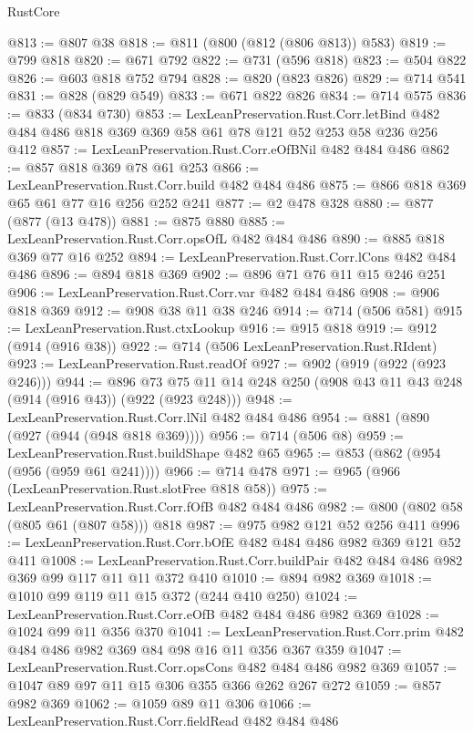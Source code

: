 \begin{lexlean}{RustCore}
\begin{coremodule}
@813 := @807 @38
@818 := @811 (@800 (@812 (@806 @813)) @583)
@819 := @799 @818
@820 := @671 @792
@822 := @731 (@596 @818)
@823 := @504 @822
@826 := @603 @818 @752 @794
@828 := @820 (@823 @826)
@829 := @714 @541
@831 := @828 (@829 @549)
@833 := @671 @822 @826
@834 := @714 @575
@836 := @833 (@834 @730)
@853 := LexLeanPreservation.Rust.Corr.letBind
    @482
    @484
    @486
    @818
    @369
    @369
    @58
    @61
    @78
    @121
    @52
    @253
    @58
    @236
    @256
    @412
@857 := LexLeanPreservation.Rust.Corr.eOfBNil @482 @484 @486
@862 := @857 @818 @369 @78 @61 @253
@866 := LexLeanPreservation.Rust.Corr.build @482 @484 @486
@875 := @866 @818 @369 @65 @61 @77 @16 @256 @252 @241
@877 := @2 @478 @328
@880 := @877 (@877 (@13 @478))
@881 := @875 @880
@885 := LexLeanPreservation.Rust.Corr.opsOfL @482 @484 @486
@890 := @885 @818 @369 @77 @16 @252
@894 := LexLeanPreservation.Rust.Corr.lCons @482 @484 @486
@896 := @894 @818 @369
@902 := @896 @71 @76 @11 @15 @246 @251
@906 := LexLeanPreservation.Rust.Corr.var @482 @484 @486
@908 := @906 @818 @369
@912 := @908 @38 @11 @38 @246
@914 := @714 (@506 @581)
@915 := LexLeanPreservation.Rust.ctxLookup
@916 := @915 @818
@919 := @912 (@914 (@916 @38))
@922 := @714 (@506 LexLeanPreservation.Rust.RIdent)
@923 := LexLeanPreservation.Rust.readOf
@927 := @902 (@919 (@922 (@923 @246)))
@944 := @896 @73 @75 @11 @14 @248 @250 (@908 @43 @11 @43 @248 (@914 (@916 @43)) (@922 (@923 @248)))
@948 := LexLeanPreservation.Rust.Corr.lNil @482 @484 @486
@954 := @881 (@890 (@927 (@944 (@948 @818 @369))))
@956 := @714 (@506 @8)
@959 := LexLeanPreservation.Rust.buildShape @482 @65
@965 := @853 (@862 (@954 (@956 (@959 @61 @241))))
@966 := @714 @478
@971 := @965 (@966 (LexLeanPreservation.Rust.slotFree @818 @58))
@975 := LexLeanPreservation.Rust.Corr.fOfB @482 @484 @486
@982 := @800 (@802 @58 (@805 @61 (@807 @58))) @818
@987 := @975 @982 @121 @52 @256 @411
@996 := LexLeanPreservation.Rust.Corr.bOfE @482 @484 @486 @982 @369 @121 @52 @411
@1008 := LexLeanPreservation.Rust.Corr.buildPair @482 @484 @486 @982 @369 @99 @117 @11 @11 @372 @410
@1010 := @894 @982 @369
@1018 := @1010 @99 @119 @11 @15 @372 (@244 @410 @250)
@1024 := LexLeanPreservation.Rust.Corr.eOfB @482 @484 @486 @982 @369
@1028 := @1024 @99 @11 @356 @370
@1041 := LexLeanPreservation.Rust.Corr.prim @482 @484 @486 @982 @369 @84 @98 @16 @11 @356 @367 @359
@1047 := LexLeanPreservation.Rust.Corr.opsCons @482 @484 @486 @982 @369
@1057 := @1047 @89 @97 @11 @15 @306 @355 @366 @262 @267 @272
@1059 := @857 @982 @369
@1062 := @1059 @89 @11 @306
@1066 := LexLeanPreservation.Rust.Corr.fieldRead @482 @484 @486

\end{coremodule}
\end{lexlean}
